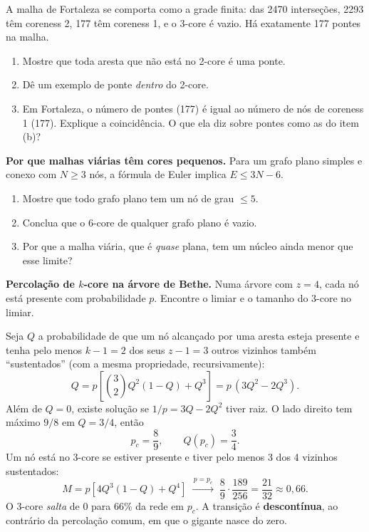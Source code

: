 \documentclass[11pt]{article}
\begin{document}
A malha de Fortaleza se comporta como a grade finita: das 2470 interseções, 2293 têm coreness 2, 177 têm coreness 1, e o 3-core é vazio. Há exatamente 177 pontes na malha.

\begin{enumerate}
  \item Mostre que toda aresta que não está no 2-core é uma ponte.
  \item Dê um exemplo de ponte \emph{dentro} do 2-core.
  \item Em Fortaleza, o número de pontes (177) é igual ao número de nós de coreness 1 (177). Explique a coincidência. O que ela diz sobre pontes como as do item (b)?
\end{enumerate}

 \textbf{Por que malhas viárias têm cores pequenos.} Para um grafo plano simples e conexo com $N\ge3$ nós, a fórmula de Euler implica $E\le3N-6$.
\begin{enumerate}
  \item Mostre que todo grafo plano tem um nó de grau $\le5$.
  \item Conclua que o 6-core de qualquer grafo plano é vazio.
  \item Por que a malha viária, que é \emph{quase} plana, tem um núcleo ainda menor que esse limite?
\end{enumerate}

\begin{exemplo}
\textbf{Percolação de $k$-core na árvore de Bethe.} Numa árvore com $z=4$, cada nó está presente com probabilidade $p$. Encontre o limiar e o tamanho do 3-core no limiar.
\end{exemplo}
\begin{solucao}
Seja $Q$ a probabilidade de que um nó alcançado por uma aresta esteja presente e tenha pelo menos $k-1 = 2$ dos seus $z-1=3$ outros vizinhos também ``sustentados'' (com a mesma propriedade, recursivamente):
\[
Q = p\left[\binom32Q^2(1-Q)+Q^3\right] = p\,(3Q^2-2Q^3).
\]
Além de $Q=0$, existe solução se $1/p = 3Q-2Q^2$ tiver raiz. O lado direito tem máximo $9/8$ em $Q = 3/4$, então
\[
p_c = \frac89, \qquad Q(p_c) = \frac34.
\]
Um nó está no 3-core se estiver presente e tiver pelo menos 3 dos 4 vizinhos sustentados:
\[
M = p\left[4Q^3(1-Q)+Q^4\right] \;\xrightarrow{\,p=p_c\,}\; \frac89\cdot\frac{189}{256} = \frac{21}{32}\approx0{,}66.
\]
O 3-core \emph{salta} de 0 para 66\% da rede em $p_c$. A transição é \textbf{descontínua}, ao contrário da percolação comum, em que o gigante nasce do zero.
\end{solucao}
\end{document}
